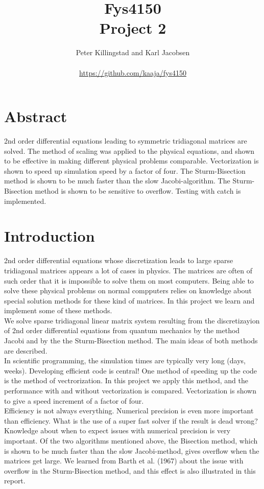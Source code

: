 \documentclass{article}
\title{Fys4150\\Project 2\\ }
\author{Peter Killingstad and Karl Jacobsen\\
\\
\url{https://github.com/kaaja/fys4150}}
\begin{document}
	
\maketitle

\section*{Abstract}
2nd order differential equations leading to symmetric tridiagonal matrices are solved. The method of scaling was applied to the physical equations, and shown to be effective in making different physical problems comparable.  Vectorization is shown to speed up simulation speed by a factor of four. The Sturm-Bisection method is shown to be much faster than the slow Jacobi-algorithm. The Sturm-Bisection method is shown to be sensitive to overflow. Testing with catch is implemented.

\section{Introduction}
2nd order differential equations whose discretization leads to large sparse tridiagonal matrices appears a lot of cases in physics. The matrices are often of such order that it is impossible to solve them on most computers. Being able to solve these physical problems on normal compputers relies on knowledge about special solution methods for these kind of matrices. In this project we learn and implement some of these methods.\\

We solve sparse tridiagonal linear matrix system resulting from the discretizayion of 2nd order differential equations from quantum mechanics by the method Jacobi and by the the Sturm-Bisection method. The main ideas of both methods are described.\\

In scientific programming, the simulation times are typically very long (days, weeks). Developing efficient code is central! One method of speeding up the code is the method of vectrorization. In this project we apply this method, and the performance with and without vectorization is compared. Vectorization is shown to give a speed increment of a factor of four. \\

Efficiency is not always everything. Numerical precision is even more important than efficiency. What is the use of a super fast solver if the result is dead wrong? Knowledge about when to expect issues with numerical precision is very important. Of the two algorithms mentioned above, the Bisection method, which is shown to be much faster than the slow Jacobi-method, gives overflow when the matrices get large. We learned from Barth et al. (1967) \cite{barth} about the issue with overflow in the Sturm-Bisection method, and this effect is also illustrated in this report.\\
\end{document}
